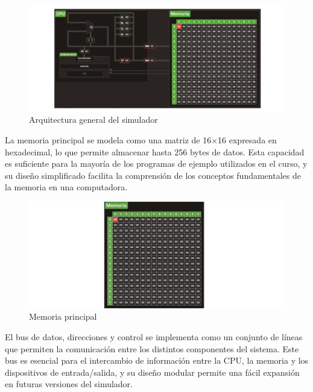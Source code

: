\documentclass[12pt,oneside]{templates/unerthesis}
\begin{document}
\begin{figure}

{\centering \includegraphics[width=0.85\linewidth]{images/esquemavonsim8} 

}

\caption{Arquitectura general del simulador}\label{fig:esquemavonsim8}
\end{figure}

La memoria principal se modela como una matriz de 16×16 expresada en hexadecimal, lo que permite almacenar hasta 256 bytes de datos. Esta capacidad es suficiente para la mayoría de los programas de ejemplo utilizados en el curso, y su diseño simplificado facilita la comprensión de los conceptos fundamentales de la memoria en una computadora.

\begin{figure}

{\centering \includegraphics[width=0.85\linewidth]{images/memoria} 

}

\caption{Memoria principal}\label{fig:memoria}
\end{figure}

El bus de datos, direcciones y control se implementa como un conjunto de líneas que permiten la comunicación entre los distintos componentes del sistema. Este bus es esencial para el intercambio de información entre la CPU, la memoria y los dispositivos de entrada/salida, y su diseño modular permite una fácil expansión en futuras versiones del simulador.
\end{document}

